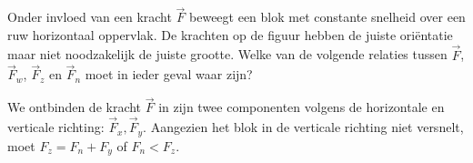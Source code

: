 \documentclass{ximera}
\begin{document}
\begin{exercise}
	Onder invloed van een kracht $\vec{F}$ beweegt een blok met constante snelheid over een ruw horizontaal oppervlak. De krachten op de figuur hebben de juiste ori\"entatie maar niet noodzakelijk de juiste grootte. Welke van de volgende relaties tussen $\vec{F}$, $\vec{F}_w$, $\vec{F}_z$ en $\vec{F}_n$ moet in ieder geval waar zijn?

	\begin{minipage}[t]{0.6\textwidth}
	\begin{multipleChoice}
	\end{multipleChoice}
	\end{minipage}
	\hfill
	\begin{minipage}[t]{.37\linewidth}
	\end{minipage}

	\begin{oplossing}
	We ontbinden de kracht $\vec{F}$ in zijn twee componenten volgens de horizontale en verticale richting: $\vec{F}_x,\vec{F}_y$. Aangezien het blok in de verticale richting niet versnelt, moet $F_z=F_n+F_y$ of $F_n<F_z$.
	\end{oplossing}
\end{exercise}
\end{document}
